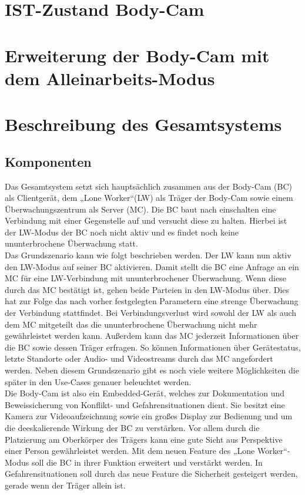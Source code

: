 \documentclass[thesis.tex]{subfiles}
\begin{document}
\section{IST-Zustand Body-Cam}
\section{Erweiterung der Body-Cam mit dem Alleinarbeits-Modus}
\section{Beschreibung des Gesamtsystems}

\subsection{Komponenten}
Das Gesamtsystem setzt sich hauptsächlich zusammen aus der Body-Cam (BC) als Clientgerät, dem „Lone Worker“(LW)
als Träger der Body-Cam sowie einem Überwachungszentrum als Server (MC).
Die BC baut nach einschalten eine Verbindung mit einer Gegenstelle auf und versucht diese zu halten.
Hierbei ist der LW-Modus der BC noch nicht aktiv und es findet noch keine ununterbrochene Überwachung statt.
\\

Das Grundszenario kann wie folgt beschrieben werden. Der LW kann nun aktiv den LW-Modus auf seiner BC aktivieren.
Damit stellt die BC eine Anfrage an ein MC für eine LW-Verbindung mit ununterbrochener Überwachung.
Wenn diese durch das MC bestätigt ist, gehen beide Parteien in den LW-Modus über.
Dies hat zur Folge das nach vorher festgelegten Parametern eine strenge Überwachung der Verbindung stattfindet.
Bei Verbindungsverlust wird sowohl der LW als auch dem MC mitgeteilt das die ununterbrochene Überwachung nicht mehr gewährleistet werden kann.
Außerdem kann das MC jederzeit Informationen über die BC sowie dessen Träger erfragen.
So können Informationen über Gerätestatus, letzte Standorte oder Audio- und Videostreams durch das MC angefordert werden.
Neben diesem Grundszenario gibt es noch viele weitere Möglichkeiten die später in den Use-Cases genauer beleuchtet werden.
\\

Die Body-Cam ist also ein Embedded-Gerät, welches zur Dokumentation und Beweissicherung von Konflikt- und Gefahrensituationen dient.
Sie besitzt eine Kamera zur Videoaufzeichnung sowie ein großes Display zur Bedienung und um die deeskalierende Wirkung der BC zu verstärken.
Vor allem durch die Platzierung am Oberkörper des Trägers kann eine gute Sicht aus Perspektive einer Person gewährleistet werden.
Mit dem neuen Feature des „Lone Worker“-Modus soll die BC in ihrer Funktion erweitert und verstärkt werden.
In Gefahrensituationen soll durch das neue Feature die Sicherheit gesteigert werden, gerade wenn der Träger allein ist.
\\
\end{document}
